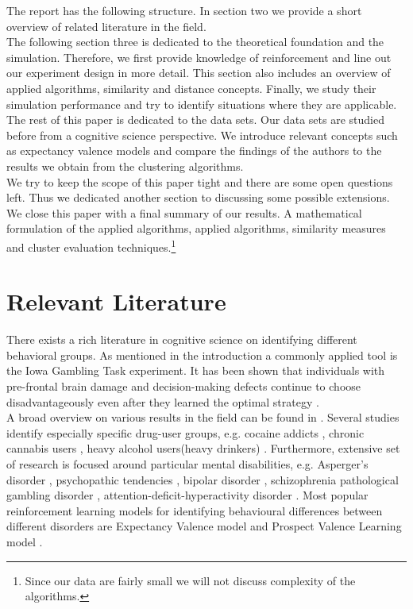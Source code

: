 \documentclass[12pt,a4paper,bibliography=totocnumbered,listof=totocnumbered]{scrartcl}
\begin{document}
The report has the following structure. In section two we provide a short overview of related literature in the field.\\ 
The following section three is dedicated to the theoretical foundation and the simulation. Therefore, we first provide knowledge of reinforcement and line out our experiment design in more detail. This section also includes an overview of applied algorithms, similarity and distance concepts. Finally, we study their simulation performance and try to identify situations where they are applicable.\\ 
The rest of this paper is dedicated to the data sets. Our data sets are studied before from a cognitive science perspective. We introduce relevant concepts such as expectancy valence models and compare the findings of the authors to the results we obtain from the clustering algorithms.\\
We try to keep the scope of this paper tight and there are some open questions left. Thus we dedicated another section to discussing some possible extensions. We close this paper with a final summary of our results.
A mathematical formulation of the applied algorithms, applied algorithms, similarity measures and cluster evaluation techniques.\footnote{Since our data are fairly small we will not discuss complexity of the algorithms.}


\section{Relevant Literature}

There exists a rich literature in cognitive science on identifying different behavioral groups. As mentioned in the introduction a commonly applied tool is the Iowa Gambling Task experiment. It has been shown that individuals with pre-frontal brain damage and decision-making defects continue to choose disadvantageously even after they learned the optimal strategy \cite{Bechara1997}.\\
A broad overview on various results in the field can be found in \cite{Steingroever2013}. Several studies identify especially specific drug-user groups, e.g. cocaine addicts \cite{Stout2004}, chronic cannabis users \cite{Fridberg2010}, heavy alcohol users(heavy drinkers) \cite{Gullo2011}. Furthermore, extensive set of research is focused around particular mental disabilities, e.g. Asperger's disorder \cite{Johnson2006}, psychopathic tendencies \cite{Blair2001}, bipolar disorder \cite{Brambilla2012}, schizophrenia \cite{Martino2007} pathological gambling disorder \cite{Cavedini2002}, attention-deficit-hyperactivity disorder \cite{NiritAgay2010}. Most popular reinforcement learning models for identifying behavioural differences between different disorders are Expectancy Valence model \cite{Busemeyer2002} and Prospect Valence Learning model \cite{Ahn2008}.
\end{document}
